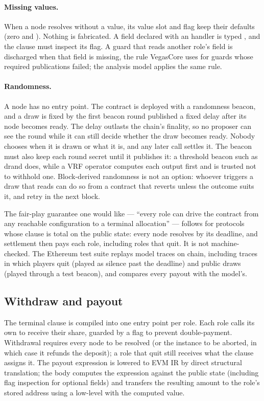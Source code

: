 \paragraph{Missing values.}  When a node resolves without a value, its
value slot and  flag keep their defaults (zero and
).  Nothing is fabricated.  A field declared with an
 handler is typed , and the  clause
must inspect its  flag.  A  guard that reads
another role's field is discharged when that field is missing, the rule
VegasCore uses for guards whose required publications failed; the
analysis model applies the same rule.

\paragraph{Randomness.}  A  node has no entry point.  The
contract is deployed with a randomness beacon, and a draw is fixed by
the first beacon round published a fixed delay after its node becomes
ready.  The delay outlasts the chain's finality, so no proposer can see
the round while it can still decide whether the draw becomes ready.
Nobody chooses when it is drawn or what it is, and any later call
settles it.  The beacon must also keep each round secret until it
publishes it: a threshold beacon such as drand does, while a VRF
operator computes each output first and is trusted not to withhold one.
Block-derived randomness is not an option: whoever triggers a draw
that reads  can do so from a contract that reverts
unless the outcome suits it, and retry in the next block.

The fair-play guarantee one would like --- ``every role can drive the
contract from any reachable configuration to a terminal allocation''
--- follows for protocols whose  clause is total on the
public state: every node resolves by its deadline, and settlement then
pays each role, including roles that quit.  It is not machine-checked.
The Ethereum test suite replays model traces on chain, including traces
in which players quit (played as silence past the deadline) and public
draws (played through a test beacon), and compares every payout with the
model's.

\subsection{Withdraw and payout}

The terminal  clause is compiled into one entry
point per role.  Each role calls its own
 to receive their share, guarded by
a  flag to prevent double-payment.
Withdrawal requires every node to be resolved (or the instance to be
aborted, in which case it refunds the deposit); a role that quit
still receives what the  clause assigns it.  The
payout expression is lowered to EVM IR by direct structural
translation; the body computes the expression against the public
state (including  flag inspection for optional fields)
and transfers the resulting amount to the role's stored address
using a low-level  with the computed value.

